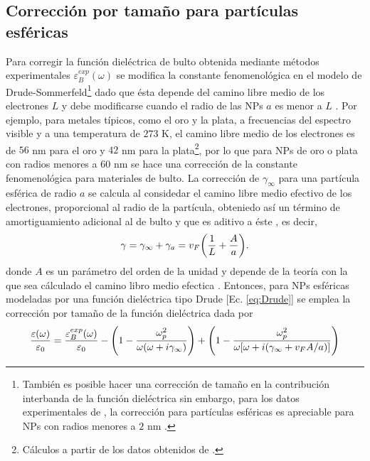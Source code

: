 \subsection{Corrección por tamaño para partículas esféricas}

Para corregir la función dieléctrica de bulto obtenida mediante métodos experimentales $\varepsilon_B^{exp}(\omega)$ se modifica la constante fenomenológica  en el modelo de Drude-Sommerfeld\footnote{También es posible hacer una corrección de tamaño en la contribución interbanda de la función dieléctrica sin embargo, para los datos experimentales de \cite{johnson1972constants}, la corrección para partículas esféricas es apreciable para NPs con radios menores a $2$ nm \cite{mendoza2014determination}.} dado que ésta depende del camino libre medio de los electrones $L$ y debe modificarse cuando el radio de las NPs $a$ es menor a $L$ \cite{kreibig1995clusters}. Por ejemplo, para metales típicos, como el oro y la plata, a frecuencias del espectro visible y a una temperatura de $273$ K, el camino libre medio de los electrones es  de $56$ nm para el oro y $42$ nm para la plata\footnote{Cálculos a partir de los datos obtenidos de \cite{ashcroft1976solid}.}, por lo que para NPs de oro o plata con radios menores a $60$ nm se hace una corrección de la constante fenomenológica para materiales de bulto. La corrección de $\gamma_\infty$ para una partícula esférica de radio $a$ se calcula al considedar el camino libre medio efectivo de los electrones, proporcional al radio de la partícula, obteniedo así un término de amortiguamiento adicional al de bulto y que es aditivo a éste \cite{kreibig1995clusters}, es decir,
	\begin{align*}
	 \gamma = \gamma_\infty + \gamma_a = v_F \qty(\frac{1}{L}+\frac{A}{a}). 
	\end{align*}
donde $A$ es un parámetro del orden de la unidad \cite{noguez2007surface,mendoza2014determination} y depende de la teoría con la que sea cálculado el camino libro medio efectica \cite{kreibig1995clusters}.  Entonces, para NPs esféricas modeladas por una función dieléctrica tipo Drude [Ec.  \eqref{eq:Drude}] se emplea  la corrección por tamaño de la función dieléctrica dada por
	\begin{align}
	\frac{\varepsilon(\omega)}{\varepsilon_0} = \frac{\varepsilon_B^{exp}(\omega)}{\varepsilon_0}
						 - \qty( 1 - \frac{\omega_p^2}{\omega(\omega+i\gamma_\infty)}) 
						 + \qty( 1 - \frac{\omega_p^2}{\omega[\omega+i(\gamma_\infty + v_F A/a)]})
	\end{align}
